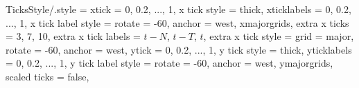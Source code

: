 
\pgfplotsset
{
	TicksStyle/.style =
	{
		xtick					= {0, 0.2, ..., 1},
		x tick style 			= {thick},
		xticklabels				= {0, 0.2, ..., 1},
		x tick label style		= {rotate = -60, anchor = west},
		xmajorgrids,
		extra x ticks			= {3, 7, 10},
		extra x tick labels		= {$t - N$, $t - T$, $t$},
		extra x tick style		= {grid = major, rotate = -60, anchor = west},
		ytick					= {0, 0.2, ..., 1},
		y tick style 			= {thick},
		yticklabels				= {0, 0.2, ..., 1},
		y tick label style		= {rotate = -60, anchor = west},
		ymajorgrids,
		scaled ticks			= false, %
	}
}
